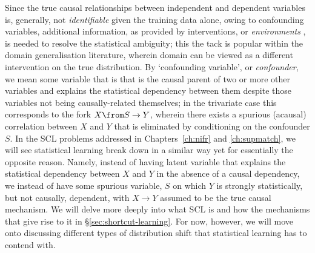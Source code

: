 Since the true causal relationships between independent and dependent variables is, generally, not
\emph{identifiable} given the training data alone, owing to confounding variables, additional
information, as provided by interventions, or \emph{environments} \citep{peters2016causal}, is
needed to resolve the statistical ambiguity; this  the tack is popular within the domain
generalisation literature, wherein domain can be viewed as a different intervention on the true
distribution.
%
By `confounding variable', or \emph{confounder}, we mean some variable that is that is the causal
parent of two or more other variables and explains the statistical dependency between them despite
those variables not being causally-related themselves; in the trivariate case this corresponds to
the fork \(X \from S \to Y \), wherein there exists a spurious (acausal) correlation between \(X\)
and \(Y\) that is eliminated by conditioning on the confounder \(S\).
%
In the \ac{SCL} problems addressed in Chapters~\ref{ch:nifr} and \ref{ch:supmatch}, we will see
statistical learning break down in a similar way yet for essentially the opposite reason.
%
Namely, instead of having latent variable that explains the statistical dependency between \(X\)
and \(Y\) in the absence of a causal dependency, we instead of have some spurious variable, \(S\)
on which \(Y\) is strongly statistically, but not causally, dependent, with \(X \to Y \) assumed to
be the true causal mechanism.
%
We will delve more deeply into what \ac{SCL} is and how the mechanisms that give rise to it in
\S\ref{sec:shortcut-learning}.
%
For now, however, we will move onto discussing different types of distribution shift that
statistical learning has to contend with.



